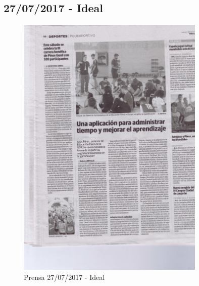 \subsection{27/07/2017 - Ideal}
\begin{figure}[ht]
	\centering
	\includegraphics[width=0.8\textwidth]{prensa/IDEAL_27_07_2017_b.png}
	\caption{Prensa 27/07/2017 - Ideal}
	\label{prensa3}
\end{figure}

\newpage


